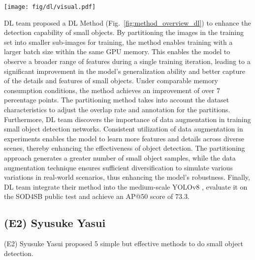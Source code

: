 \documentclass{mva_style}
\begin{document}
\begin{figure*}[t]
  \begin{center}
    \texttt{[image: fig/dl/visual.pdf]}
  \end{center}
  \vspace{-1em}
  \caption{DL Method overview.}
  \label{fig:method_overview_dl}
\end{figure*}




DL team proposed a DL Method (Fig.~\ref{fig:method_overview_dl}) to enhance the detection capability of small objects. By partitioning the images in the training set into smaller sub-images for training, the method enables training with a larger batch size within the same GPU memory. This enables the model to observe a broader range of features during a single training iteration, leading to a significant improvement in the model's generalization ability and better capture of the details and features of small objects. Under comparable memory consumption conditions, the method achieves an improvement of over 7 percentage points. The partitioning method takes into account the dataset characteristics to adjust the overlap rate and annotation for the partitions. Furthermore, DL team discovers the importance of data augmentation in training small object detection networks. Consistent utilization of data augmentation in experiments enables the model to learn more features and details across diverse scenes, thereby enhancing the effectiveness of object detection. The partitioning approach generates a greater number of small object samples, while the data augmentation technique ensures sufficient diversification to simulate various variations in real-world scenarios, thus enhancing the model's robustness. Finally, DL team integrate their method into the medium-scale YOLOv8 \cite{yolo}, evaluate it on the SOD4SB public test and achieve an AP@50 score of 73.3.

\subsection{(E2) Syusuke Yasui}

(E2) Syusuke Yasui proposed 5 simple but effective methods to do small object detection.
\end{document}
